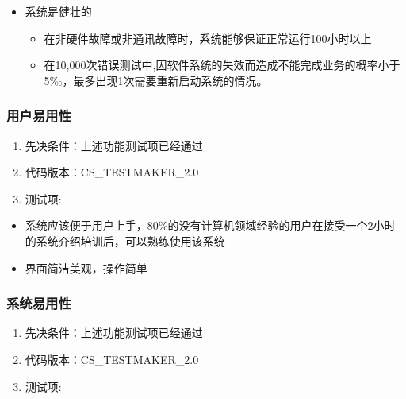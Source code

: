 \documentclass[hyperref, a4paper]{ctexart}
\providecommand{\tightlist}{%
  \setlength{\itemsep}{0pt}\setlength{\parskip}{0pt}}
\begin{document}
\begin{itemize}
\tightlist
\item
  系统是健壮的

  \begin{itemize}
  \tightlist
  \item
    在非硬件故障或非通讯故障时，系统能够保证正常运行100小时以上
  \item
    在10,000次错误测试中,因软件系统的失效而造成不能完成业务的概率小于5‰，最多出现1次需要重新启动系统的情况。
  \end{itemize}
\end{itemize}

\hypertarget{ux7528ux6237ux6613ux7528ux6027}{%
\subsubsection{用户易用性}\label{ux7528ux6237ux6613ux7528ux6027}}

\begin{enumerate}
\def\labelenumi{\arabic{enumi}.}
\tightlist
\item
  先决条件：上述功能测试项已经通过
\item
  代码版本：CS\_TESTMAKER\_2.0
\item
  测试项:
\end{enumerate}

\begin{itemize}
\tightlist
\item
  系统应该便于用户上手，80\%的没有计算机领域经验的用户在接受一个2小时的系统介绍培训后，可以熟练使用该系统
\item
  界面简洁美观，操作简单
\end{itemize}

\hypertarget{ux7cfbux7edfux6613ux7528ux6027}{%
\subsubsection{系统易用性}\label{ux7cfbux7edfux6613ux7528ux6027}}

\begin{enumerate}
\def\labelenumi{\arabic{enumi}.}
\tightlist
\item
  先决条件：上述功能测试项已经通过
\item
  代码版本：CS\_TESTMAKER\_2.0
\item
  测试项:
\end{enumerate}
\end{document}
